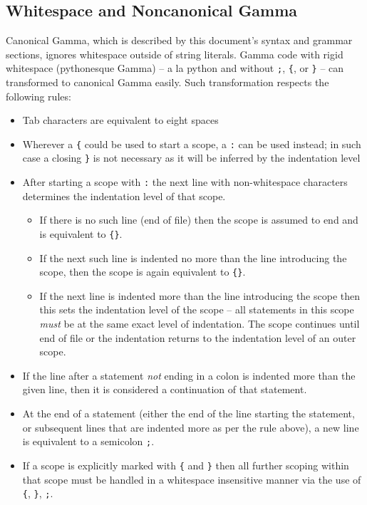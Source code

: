 \subsection{Whitespace and Noncanonical Gamma}
Canonical Gamma, which is described by this document's syntax and grammar sections, ignores whitespace outside of string literals. Gamma code with rigid whitespace (pythonesque Gamma) -- a la python and without \verb!;!, \verb!{!, or \verb!}! -- can transformed to canonical Gamma easily. Such transformation respects the following rules:
\begin{itemize}
\item Tab characters are equivalent to eight spaces
\item Wherever a \verb!{! could be used to start a scope, a \verb!:! can be used instead; in such case a closing \verb!}! is not necessary as it will be inferred by the indentation level
\item After starting a scope with \verb!:! the next line with non-whitespace characters determines the indentation level of that scope.
\begin{itemize}
\item If there is no such line (end of file) then the scope is assumed to end and is equivalent to \verb!{}!.
\item If the next such line is indented no more than the line introducing the scope, then the scope is again equivalent to \verb!{}!.
\item If the next line is indented more than the line introducing the scope then this sets the indentation level of the scope -- all statements in this scope \emph{must} be at the same exact level of indentation. The scope continues until end of file or the indentation returns to the indentation level of an outer scope.
\end{itemize}
\item If the line after a statement \emph{not} ending in a colon is indented more than the given line, then it is considered a continuation of that statement.
\item At the end of a statement (either the end of the line starting the statement, or subsequent lines that are indented more as per the rule above), a new line is equivalent to a semicolon \verb!;!.
\item If a scope is explicitly marked with \verb!{! and \verb!}! then all further scoping within that scope must be handled in a whitespace insensitive manner via the use of \verb!{!, \verb!}!, \verb!;!. 
\end{itemize}

